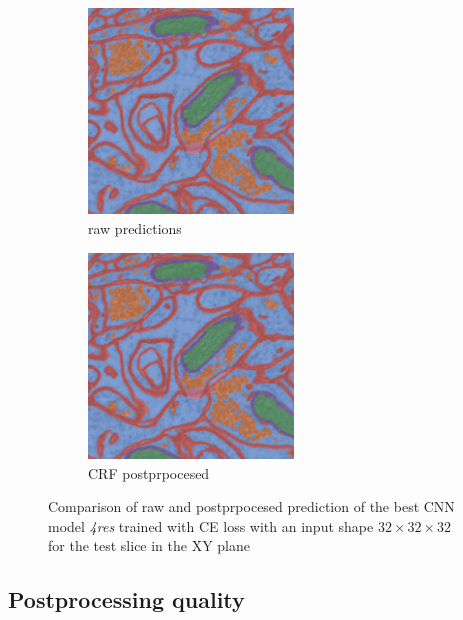\documentclass[twocolumn, a4paper]{article}
\theoremstyle{definition}
\begin{document}
\begin{figure}[t]
    \begin{subfigure}{0.49 \textwidth}
        \centering
        \includegraphics[width=0.6\textwidth]{raw_pred.png}
        \caption{raw predictions}
    \end{subfigure}
    \begin{subfigure}{0.49 \textwidth}
        \centering
        \includegraphics[width=0.6\textwidth]{crf_pred.png}
        \caption{CRF postprpocesed}
    \end{subfigure}
    \caption{Comparison of raw and postprpocesed prediction of the best CNN model \textit{4res} trained with CE loss
        with an input shape \( 32 \times 32 \times 32 \) for the test slice in the XY plane}
    \label{fig:crf_comparison}
\end{figure}

\subsection{Postprocessing quality}
\end{document}
